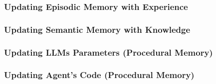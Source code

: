 \subsubsection{Updating Episodic Memory with Experience}

\subsubsection{Updating Semantic Memory with Knowledge}

\subsubsection{Updating LLMs Parameters (Procedural Memory)}

\subsubsection{Updating Agent's Code (Procedural Memory)}

